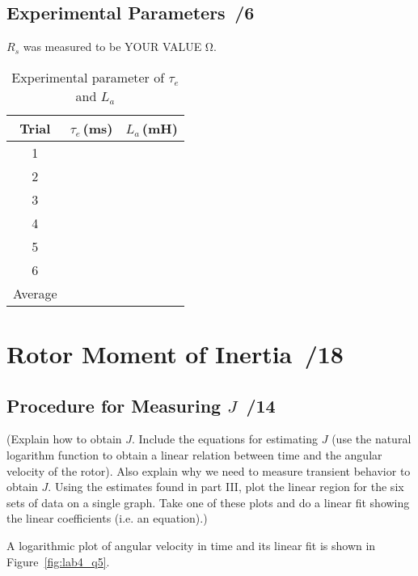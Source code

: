 \documentclass{article}
\newcommand{\score}{\hfill \underline{\hspace{0.65cm}}\,/} %
\begin{document}
\subsection{Experimental Parameters \score 6}
$R_s$ was measured to be YOUR VALUE \si{\ohm}.
\begin{table}[phtb] 
\begin{center}
\caption{Experimental parameter of $\tau_e$ and $L_a$}
\label{tbl:lab4_q4}
\begin{tabular}{c|r|r} \hline \hline
\cellcolor{lightgray} Trial & \cellcolor{lightgray} $\tau_e$\,(\si{\milli\second}) & \cellcolor{lightgray} $L_a$\,(\si{\milli\henry}) \\
\hline
1 &  &  \\ \hline
2 &  &  \\ \hline
3 &  &  \\ \hline
4 &  &  \\ \hline
5 &  &  \\ \hline
6 &  &  \\ \hline
Average &  & \\\hline
\end{tabular}
\end{center}
\end{table}

\section{Rotor Moment of Inertia \score 18}
\subsection{Procedure for Measuring $J$ \score 14}
(Explain how to obtain $J$. Include the equations for estimating $J$ (use the natural logarithm function to obtain a linear relation between time and the angular velocity of the rotor). Also explain why we need to measure transient behavior to obtain $J$. Using the estimates found in part III, plot the linear region for the six sets of data on a single graph. Take one of these plots and do a linear fit showing the linear coefficients (i.e. an equation).)

A logarithmic plot of angular velocity in time and its linear fit is shown in Figure~\ref{fig:lab4_q5}.

\end{document}
